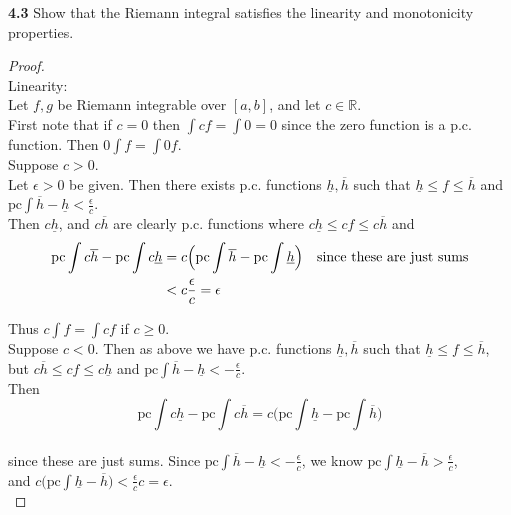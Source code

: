 \documentclass[12pt]{article}
\begin{document}
\hspace{-4 ex}\textbf{4.3} Show that the Riemann integral satisfies the linearity and monotonicity properties. \bigbreak

	\begin{proof}  \text{ }\\
		Linearity: \\
		
		Let $f,g$ be Riemann integrable over $[a,b]$, and let $c \in \mathbb{R}$. \\
		
		First note that if $c=0$ then $\int cf = \int 0 = 0$ since the zero function is a p.c. function. Then $0 \int f = \int 0 f$. \\
		Suppose $c > 0$. \\
		Let $\epsilon > 0$ be given. Then there exists p.c. functions $\underline{h}, \overline{h}$ such that $\underline{h} \leq f \leq \overline{h}$ and $\text{pc}\int \overline{h} - \underline{h} < \frac{\epsilon}{c}$. \\
		Then $c\underline{h}$, and $c\overline{h}$ are clearly p.c. functions where $c\underline{h} \leq cf \leq c\overline{h}$ and \\
		\begin{align*}
			\text{pc}\int c \overline{h} - \text{pc}\int c \underline{h} &  = c \Big(\text{pc}\int  \overline{h} - \text{pc}\int \underline{h} \Big) \text{\space \space \space since these are just sums}\\
			& < c \frac{\epsilon}{c} = \epsilon \\
		\end{align*}
		
		Thus $c \int f = \int cf$ if $c \geq 0$. \\
		
		Suppose $c < 0$. Then as above we have p.c. functions $\underline{h}, \overline{h}$ such that $\underline{h} \leq f \leq \overline{h}$, but $c\overline{h} \leq cf \leq c\underline{h}$ and  $\text{pc}\int \overline{h} - \underline{h} < -\frac{\epsilon}{c}$. \\
		Then \\
		$$\text{pc}\int c \underline{h} - \text{pc}\int c \overline{h}  = c \Big(\text{pc}\int  \underline{h} - \text{pc}\int \overline{h} \Big)$$ \\
		since these are just sums. Since $\text{pc}\int \overline{h} - \underline{h} < -\frac{\epsilon}{c}$, we know $\text{pc}\int \underline{h} - \overline{h} > \frac{\epsilon}{c}$, \\
		and $c \big( \text{pc}\int \underline{h} - \overline{h} \big) < \frac{\epsilon}{c}c = \epsilon$. \\
		

\end{proof}
\end{document}
